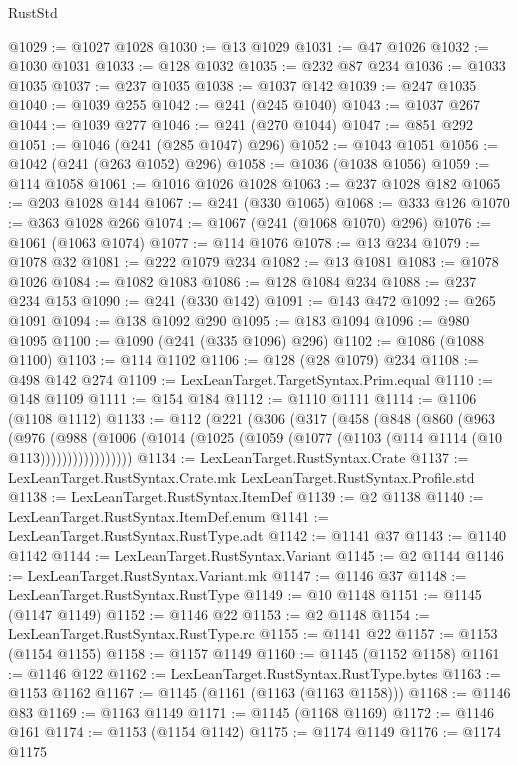 \begin{lexlean}{RustStd}
\begin{coremodule}
@1029 := @1027 @1028
@1030 := @13 @1029
@1031 := @47 @1026
@1032 := @1030 @1031
@1033 := @128 @1032
@1035 := @232 @87 @234
@1036 := @1033 @1035
@1037 := @237 @1035
@1038 := @1037 @142
@1039 := @247 @1035
@1040 := @1039 @255
@1042 := @241 (@245 @1040)
@1043 := @1037 @267
@1044 := @1039 @277
@1046 := @241 (@270 @1044)
@1047 := @851 @292
@1051 := @1046 (@241 (@285 @1047) @296)
@1052 := @1043 @1051
@1056 := @1042 (@241 (@263 @1052) @296)
@1058 := @1036 (@1038 @1056)
@1059 := @114 @1058
@1061 := @1016 @1026 @1028
@1063 := @237 @1028 @182
@1065 := @203 @1028 @144
@1067 := @241 (@330 @1065)
@1068 := @333 @126
@1070 := @363 @1028 @266
@1074 := @1067 (@241 (@1068 @1070) @296)
@1076 := @1061 (@1063 @1074)
@1077 := @114 @1076
@1078 := @13 @234
@1079 := @1078 @32
@1081 := @222 @1079 @234
@1082 := @13 @1081
@1083 := @1078 @1026
@1084 := @1082 @1083
@1086 := @128 @1084 @234
@1088 := @237 @234 @153
@1090 := @241 (@330 @142)
@1091 := @143 @472
@1092 := @265 @1091
@1094 := @138 @1092 @290
@1095 := @183 @1094
@1096 := @980 @1095
@1100 := @1090 (@241 (@335 @1096) @296)
@1102 := @1086 (@1088 @1100)
@1103 := @114 @1102
@1106 := @128 (@28 @1079) @234
@1108 := @498 @142 @274
@1109 := LexLeanTarget.TargetSyntax.Prim.equal
@1110 := @148 @1109
@1111 := @154 @184
@1112 := @1110 @1111
@1114 := @1106 (@1108 @1112)
@1133 := @112
    (@221
      (@306
        (@317
          (@458
            (@848
              (@860
                (@963
                  (@976
                    (@988
                      (@1006
                        (@1014 (@1025 (@1059 (@1077 (@1103 (@114 @1114 (@10 @113)))))))))))))))))
@1134 := LexLeanTarget.RustSyntax.Crate
@1137 := LexLeanTarget.RustSyntax.Crate.mk LexLeanTarget.RustSyntax.Profile.std
@1138 := LexLeanTarget.RustSyntax.ItemDef
@1139 := @2 @1138
@1140 := LexLeanTarget.RustSyntax.ItemDef.enum
@1141 := LexLeanTarget.RustSyntax.RustType.adt
@1142 := @1141 @37
@1143 := @1140 @1142
@1144 := LexLeanTarget.RustSyntax.Variant
@1145 := @2 @1144
@1146 := LexLeanTarget.RustSyntax.Variant.mk
@1147 := @1146 @37
@1148 := LexLeanTarget.RustSyntax.RustType
@1149 := @10 @1148
@1151 := @1145 (@1147 @1149)
@1152 := @1146 @22
@1153 := @2 @1148
@1154 := LexLeanTarget.RustSyntax.RustType.rc
@1155 := @1141 @22
@1157 := @1153 (@1154 @1155)
@1158 := @1157 @1149
@1160 := @1145 (@1152 @1158)
@1161 := @1146 @122
@1162 := LexLeanTarget.RustSyntax.RustType.bytes
@1163 := @1153 @1162
@1167 := @1145 (@1161 (@1163 (@1163 @1158)))
@1168 := @1146 @83
@1169 := @1163 @1149
@1171 := @1145 (@1168 @1169)
@1172 := @1146 @161
@1174 := @1153 (@1154 @1142)
@1175 := @1174 @1149
@1176 := @1174 @1175

\end{coremodule}
\end{lexlean}
